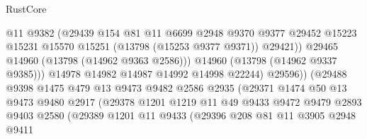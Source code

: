 \begin{lexlean}{RustCore}
\begin{coremodule}
                                    @11
                                    @9382
                                    (@29439
                                      @154
                                      @81
                                      @11
                                      @6699
                                      @2948
                                      @9370
                                      @9377
                                      @29452
                                      @15223
                                      @15231
                                      @15570
                                      @15251
                                      (@13798 (@15253 @9377 @9371))
                                      @29421))
                                  @29465
                                  @14960
                                  (@13798 (@14962 @9363 @2586)))
                                @14960
                                (@13798 (@14962 @9337 @9385)))
                              @14978
                              @14982
                              @14987
                              @14992
                              @14998
                              @22244)
                            @29596))
                        (@29488
                          @9398
                          @1475
                          @479
                          @13
                          @9473
                          @9482
                          @2586
                          @2935
                          (@29371
                            @1474
                            @50
                            @13
                            @9473
                            @9480
                            @2917
                            (@29378
                              @1201
                              @1219
                              @11
                              @49
                              @9433
                              @9472
                              @9479
                              @2893
                              @9403
                              @2580
                              (@29389
                                @1201
                                @11
                                @9433
                                (@29396
                                  @208
                                  @81
                                  @11
                                  @3905
                                  @2948
                                  @9411

\end{coremodule}
\end{lexlean}
